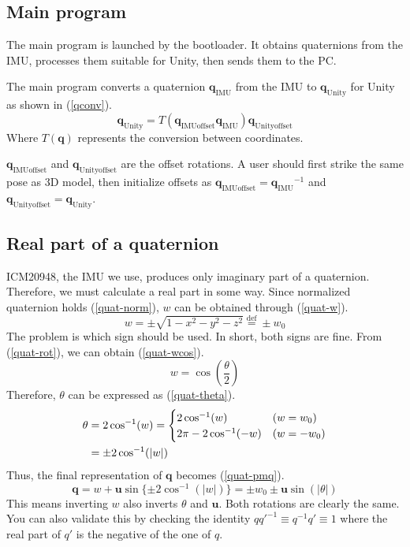 \documentclass[journal]{IEEEtran}
\begin{document}
\subsection{Main program}
The main program is launched by the bootloader.
It obtains quaternions from the IMU, processes them suitable for Unity, then sends them to the PC.

The main program converts a quaternion \(\bm{q}_{\mathrm{IMU}}\) from the IMU to \(\bm{q}_{\mathrm{Unity}}\) for Unity as shown in (\ref{qconv}).
\begin{equation}
    \bm{q}_{\mathrm{Unity}} = T(\bm{q}_{\mathrm{IMUoffset}}\bm{q}_{\mathrm{IMU}})\bm{q}_{\mathrm{Unityoffset}} \label{qconv}
\end{equation}
Where \(T(\bm{q})\) represents the conversion between coordinates.

\(\bm{q}_{\mathrm{IMUoffset}}\) and \(\bm{q}_{\mathrm{Unityoffset}}\) are the offset rotations.
A user should first strike the same pose as 3D model, then initialize offsets as \(\bm{q}_{\mathrm{IMUoffset}} = {\bm{q}_{\mathrm{IMU}}}^{-1}\) and \(\bm{q}_{\mathrm{Unityoffset}} = \bm{q}_{\mathrm{Unity}}\).

\subsection{Real part of a quaternion}
ICM20948, the IMU we use, produces only imaginary part of a quaternion.
Therefore, we must calculate a real part in some way.
Since normalized quaternion holds (\ref{quat-norm}), \(w\) can be obtained through (\ref{quat-w}).
\begin{equation}
    w = \pm\sqrt{1 - x^2 - y^2 - z^2} \overset{\mathrm{def}}{=} \pm w_0 \label{quat-w}
\end{equation}
The problem is which sign should be used.
In short, both signs are fine.
From (\ref{quat-rot}), we can obtain (\ref{quat-wcos}).
\begin{equation}
    w = \cos\left(\frac{\theta}{2}\right) \label{quat-wcos}
\end{equation}
Therefore, \(\theta\) can be expressed as (\ref{quat-theta}).
\begin{align}
    \theta &= 2\cos^{-1}(w) = \begin{cases}
        2\cos^{-1}(w) & (w = w_0) \\
        2\pi - 2\cos^{-1}(-w) & (w = -w_0)
    \end{cases} \notag \\
    &= \pm 2\cos^{-1}(|w|) \label{quat-theta}
\end{align}
Thus, the final representation of \(\bm{q}\) becomes (\ref{quat-pmq}).
\begin{equation}
    \bm{q} = w + \bm{u}\sin\{\pm 2\cos^{-1}(|w|)\} = \pm w_0 \pm \bm{u}\sin(|\theta|) \label{quat-pmq}
\end{equation}
This means inverting \(w\) also inverts \(\theta\) and \(\bm{u}\).
Both rotations are clearly the same.
You can also validate this by checking the identity \(qq'^{-1} \equiv q^{-1}q' \equiv 1\) where the real part of \(q'\) is the negative of the one of \(q\).
\end{document}
